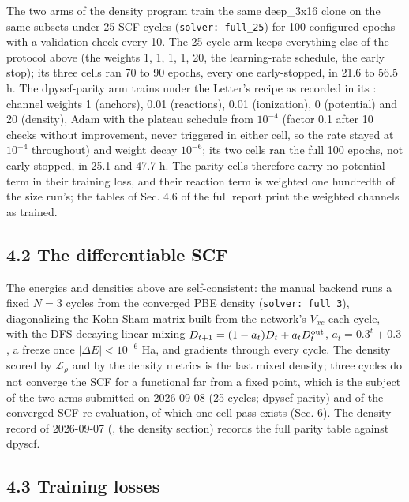 \documentclass[10pt,a4paper]{article}
\begin{document}
The two arms of the density program train the same deep\_3x16 clone on the same subsets under 25 SCF cycles (\texttt{solver: full\_25}) for 100 configured epochs with a validation check every 10. The 25-cycle arm keeps everything else of the protocol above (the weights 1, 1, 1, 1, 20, the learning-rate schedule, the early stop); its three cells ran 70 to 90 epochs, every one early-stopped, in 21.6 to 56.5 h. The dpyscf-parity arm trains under the Letter's recipe as recorded in its : channel weights 1 (anchors), 0.01 (reactions), 0.01 (ionization), 0 (potential) and 20 (density), Adam with the plateau schedule from $10^{-4}$ (factor 0.1 after 10 checks without improvement, never triggered in either cell, so the rate stayed at $10^{-4}$ throughout) and weight decay $10^{-6}$; its two cells ran the full 100 epochs, not early-stopped, in 25.1 and 47.7 h. The parity cells therefore carry no potential term in their training loss, and their reaction term is weighted one hundredth of the size run's; the tables of Sec. 4.6 of the full report print the weighted channels as trained.

\subsection*{4.2 The differentiable SCF}

The energies and densities above are self-consistent: the manual backend runs a fixed $N = 3$ cycles from the converged PBE density (\texttt{solver: full\_3}), diagonalizing the Kohn-Sham matrix built from the network's $V_{xc}$ each cycle, with the DFS decaying linear mixing $D_{t+1} = (1 - a_t) D_t + a_t D^{\rm out}_t$, $a_t = 0.3^{t} + 0.3$, a freeze once $|\Delta E| < 10^{-6}$ Ha, and gradients through every cycle. The density scored by $\mathcal{L}_\rho$ and by the density metrics is the last mixed density; three cycles do not converge the SCF for a functional far from a fixed point, which is the subject of the two arms submitted on 2026-09-08 (25 cycles; dpyscf parity) and of the converged-SCF re-evaluation, of which one cell-pass exists (Sec. 6). The density record of 2026-09-07 (, the density section) records the full parity table against dpyscf.

\subsection*{4.3 Training losses}
\end{document}
